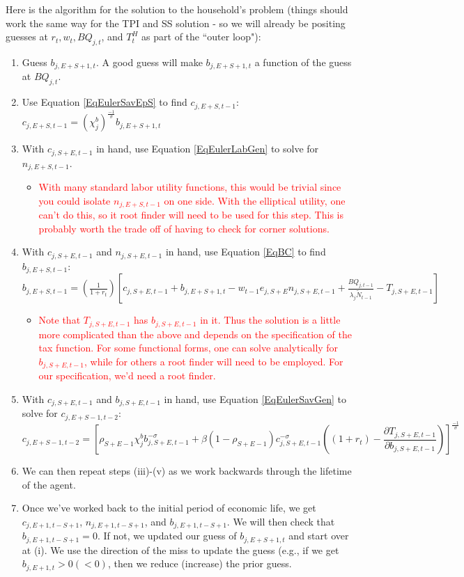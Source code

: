 \documentclass[letterpaper,12pt]{article}
\theoremstyle{definition}
\begin{document}
   Here is the algorithm for the solution to the household's problem (things should work the same way for the TPI and SS solution - so we will already be positing guesses at $r_{t}, w_{t}, BQ_{j,t}$, and $T^{H}_{t}$ as part of the ``outer loop"):
   \begin{enumerate}
   \item Guess $b_{j,E+S+1,t}$.  A good guess will make $b_{j,E+S+1,t}$ a function of the guess at $BQ_{j,t}$.
   \item Use Equation \ref{EqEulerSavEpS} to find $c_{j,E+S,t-1}$: $c_{j,E+S,t-1}=(\chi^{b}_{j})^{\frac{-1}{\sigma}}b_{j,E+S+1,t}$
   \item With $c_{j,S+E,t-1}$ in hand, use Equation \ref{EqEulerLabGen} to solve for $n_{j,E+S,t-1}$.  
   	\begin{itemize}
	\item \textcolor{red}{With many standard labor utility functions, this would be trivial since you could isolate $n_{j,E+S,t-1}$ on one side.  With the elliptical utility, one can't do this, so it root finder will need to be used for this step.  This is probably worth the trade off of having to check for corner solutions.}
	\end{itemize}
  \item With $c_{j,S+E,t-1}$ and $n_{j,S+E,t-1}$ in hand, use Equation \ref{EqBC} to find $b_{j,E+S,t-1}$:  $b_{j,E+S,t-1}=\left(\frac{1}{1+r_{t}}\right)\left[c_{j,S+E,t-1}+b_{j,E+S+1,t} - w_{t-1}e_{j,S+E}n_{j,S+E,t-1} + \frac{BQ_{j,t-1}}{\lambda_{j}\tilde{N}_{t-1}}-T_{j,S+E,t-1}\right]$
  	\begin{itemize}
	\item \textcolor{red}{Note that $T_{j,S+E,t-1}$ has $b_{j,S+E,t-1}$ in it.  Thus the solution is a little more complicated than the above and depends on the specification of the tax function.  For some functional forms, one can solve analytically for $b_{j,S+E,t-1}$, while for others a root finder will need to be employed.  For our specification, we'd need a root finder.}
	\end{itemize}
  \item With  $c_{j,S+E,t-1}$ and $b_{j,S+E,t-1}$ in hand, use Equation \ref{EqEulerSavGen} to solve for $c_{j,E+S-1,t-2}$: 
         \begin{equation*}
	c_{j,E+S-1,t-2}=\left[\rho_{S+E-1}\chi^{b}_{j}b_{j,S+E,t-1}^{-\sigma} + \beta(1-\rho_{S+E-1})c_{j,S+E,t-1}^{-\sigma}\left((1+r_{t})-\frac{\partial T_{j,S+E,t-1}}{\partial b_{j,S+E,t-1}}\right)\right]^{\frac{-1}{\sigma}}
	\end{equation*}
   \item We can then repeat steps (iii)-(v) as we work backwards through the lifetime of the agent.
   \item Once we've worked back to the initial period of economic life, we get $c_{j,E+1,t-S+1}$, $n_{j,E+1,t-S+1}$, and $b_{j,E+1,t-S+1}$.  We will then check that $b_{j,E+1,t-S+1}=0$.  If not, we updated our guess of $b_{j,E+S+1,t}$ and start over at (i).  We use the direction of the miss to update the guess (e.g., if we get $b_{j,E+1,t}>0 (<0)$, then we reduce (increase) the prior guess.
   \end{enumerate}
    
    
\end{document}
